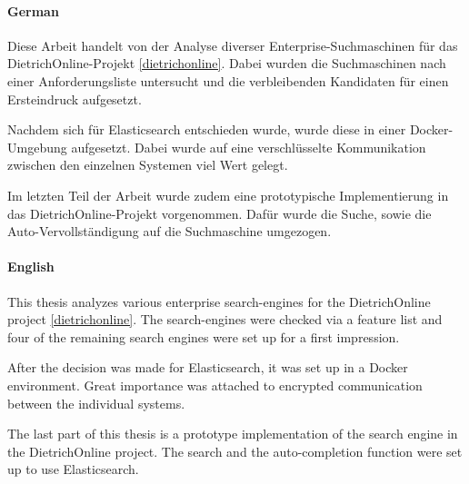 \kurzfassung

\paragraph*{German}
Diese Arbeit handelt von der Analyse diverser Enterprise-Suchmaschinen für das DietrichOnline-Projekt \ref{dietrichonline}. Dabei wurden die Suchmaschinen nach einer Anforderungsliste untersucht und die verbleibenden Kandidaten für einen Ersteindruck aufgesetzt. 

Nachdem sich für Elasticsearch entschieden wurde, wurde diese in einer Docker-Umgebung aufgesetzt. Dabei wurde auf eine verschlüsselte Kommunikation zwischen den einzelnen Systemen viel Wert gelegt.

Im letzten Teil der Arbeit wurde zudem eine prototypische Implementierung in das DietrichOnline-Projekt vorgenommen. Dafür wurde die Suche, sowie die Auto-Vervollständigung auf die Suchmaschine umgezogen.

\paragraph*{English}

This thesis analyzes various enterprise search-engines for the DietrichOnline project \ref{dietrichonline}. The search-engines were checked via a feature list and four of the remaining search engines were set up for a first impression.

After the decision was made for Elasticsearch, it was set up in a Docker environment. Great importance was attached to encrypted communication between the individual systems.

The last part of this thesis is a prototype implementation of the search engine in the DietrichOnline project. The search and the auto-completion function were set up to use Elasticsearch.